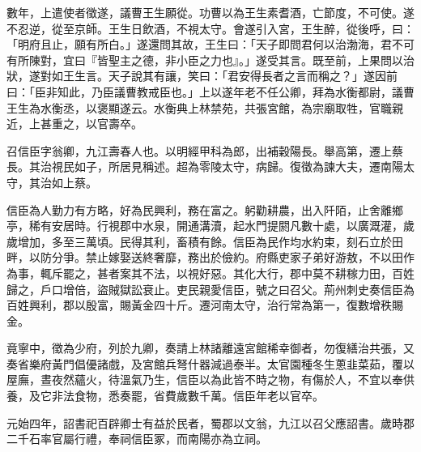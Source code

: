 \begin{pinyinscope}
數年，上遣使者徵遂，議曹王生願從。功曹以為王生素耆酒，亡節度，不可使。遂不忍逆，從至京師。王生日飲酒，不視太守。會遂引入宮，王生醉，從後呼，曰：「明府且止，願有所白。」遂還問其故，王生曰：「天子即問君何以治渤海，君不可有所陳對，宜曰『皆聖主之德，非小臣之力也』。」遂受其言。既至前，上果問以治狀，遂對如王生言。天子說其有讓，笑曰：「君安得長者之言而稱之？」遂因前曰：「臣非知此，乃臣議曹教戒臣也。」上以遂年老不任公卿，拜為水衡都尉，議曹王生為水衡丞，以褒顯遂云。水衡典上林禁苑，共張宮館，為宗廟取牲，官職親近，上甚重之，以官壽卒。

召信臣字翁卿，九江壽春人也。以明經甲科為郎，出補穀陽長。舉高第，遷上蔡長。其治視民如子，所居見稱述。超為零陵太守，病歸。復徵為諫大夫，遷南陽太守，其治如上蔡。

信臣為人勤力有方略，好為民興利，務在富之。躬勸耕農，出入阡陌，止舍離鄉亭，稀有安居時。行視郡中水泉，開通溝瀆，起水門提閼凡數十處，以廣溉灌，歲歲增加，多至三萬頃。民得其利，畜積有餘。信臣為民作均水約束，刻石立於田畔，以防分爭。禁止嫁娶送終奢靡，務出於儉約。府縣吏家子弟好游敖，不以田作為事，輒斥罷之，甚者案其不法，以視好惡。其化大行，郡中莫不耕稼力田，百姓歸之，戶口增倍，盜賊獄訟衰止。吏民親愛信臣，號之曰召父。荊州刺史奏信臣為百姓興利，郡以殷富，賜黃金四十斤。遷河南太守，治行常為第一，復數增秩賜金。

竟寧中，徵為少府，列於九卿，奏請上林諸離遠宮館稀幸御者，勿復繕治共張，又奏省樂府黃門倡優諸戲，及宮館兵弩什器減過泰半。太官園種冬生蔥韭菜茹，覆以屋廡，晝夜然蘊火，待溫氣乃生，信臣以為此皆不時之物，有傷於人，不宜以奉供養，及它非法食物，悉奏罷，省費歲數千萬。信臣年老以官卒。

元始四年，詔書祀百辟卿士有益於民者，蜀郡以文翁，九江以召父應詔書。歲時郡二千石率官屬行禮，奉祠信臣冢，而南陽亦為立祠。


\end{pinyinscope}